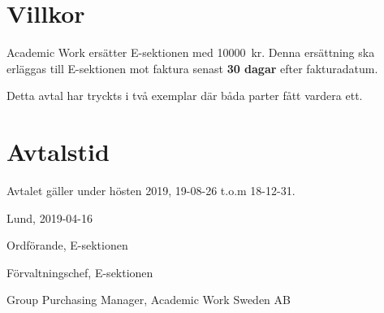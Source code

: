 \documentclass[10pt]{article}
\def\date{2019-04-16} %
\begin{document}
        \section{Villkor}
        Academic Work ersätter E-sektionen med \SI{10000}{kr}. Denna ersättning ska erläggas till E-sektionen mot faktura senast \textbf{30 dagar} efter fakturadatum.
        \newline

        Detta avtal har tryckts i två exemplar där båda parter fått vardera ett.
        
        \section{Avtalstid}
        Avtalet gäller under hösten 2019, 19-08-26 t.o.m 18-12-31.

        \begin{signatures}{3}
            Lund, \date
            \signature{Edvard Carlsson}{Ordförande, E-sektionen}
            \signature{Henrik Ramström}{Förvaltningschef, E-sektionen}
            \signature{Niklas Dennerholt}{Group Purchasing Manager, Academic Work Sweden AB}
        \end{signatures}
    
\end{document}
